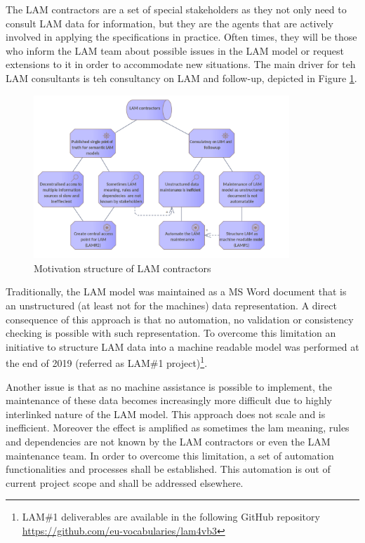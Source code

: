 	The LAM contractors are a set of special stakeholders as they not only need to consult LAM data for information, but they are the agents that are actively involved in applying the specifications in practice. Often times, they will be those who inform the LAM team about possible issues in the LAM model or request extensions to it in order to accommodate new situations. The main driver for teh LAM consultants is teh consultancy on LAM and follow-up, depicted in Figure \ref{fig:motivation-lam-contractors}. 
		 	
	\begin{figure}[h]
		\centering
		\includegraphics[width=0.859\textwidth]{images/motivation/LAM Contractors motivation.png}
		\caption{Motivation structure of LAM contractors}
		\label{fig:motivation-lam-contractors}
	\end{figure}

	Traditionally, the LAM model was maintained as a MS Word document that is an unstructured (at least not for the machines) data representation. A direct consequence of this approach is that no automation, no validation or consistency checking is possible with such representation. To overcome this limitation an initiative to structure LAM data into a machine readable model was performed at the end of 2019 (referred as LAM\#1 project)\footnote{LAM\#1 deliverables are available in the following GitHub repository \url{https://github.com/eu-vocabularies/lam4vb3}}.
		
	Another issue is that as no machine assistance is possible to implement, the maintenance of these data becomes increasingly more difficult due to highly interlinked nature of the LAM model. This approach does not scale and is inefficient. 
	Moreover the effect is amplified as sometimes the lam meaning, rules and dependencies are not known by the LAM contractors or even the LAM maintenance team. In order to overcome this limitation, a set of automation functionalities and processes shall be established. This automation is out of current project scope and shall be addressed elsewhere. 
	
